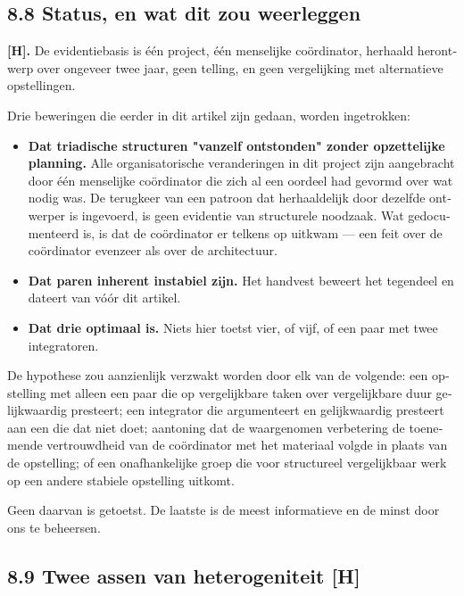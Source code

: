 \begin{dutch}
\subsection*{8.8 Status, en wat dit zou weerleggen}
\label{sec:nl:8.8}

\textbf{[H].} De evidentiebasis is één project, één menselijke coördinator, herhaald herontwerp over ongeveer twee jaar, geen telling, en geen vergelijking met alternatieve opstellingen.

Drie beweringen die eerder in dit artikel zijn gedaan, worden ingetrokken:

\begin{itemize}
  \item \textbf{Dat triadische structuren "vanzelf ontstonden" zonder opzettelijke planning.} Alle organisatorische veranderingen in dit project zijn aangebracht door één menselijke coördinator die zich al een oordeel had gevormd over wat nodig was. De terugkeer van een patroon dat herhaaldelijk door dezelfde ontwerper is ingevoerd, is geen evidentie van structurele noodzaak. Wat gedocumenteerd is, is dat de coördinator er telkens op uitkwam — een feit over de coördinator evenzeer als over de architectuur.
  \item \textbf{Dat paren inherent instabiel zijn.} Het handvest beweert het tegendeel en dateert van vóór dit artikel.
  \item \textbf{Dat drie optimaal is.} Niets hier toetst vier, of vijf, of een paar met twee integratoren.
\end{itemize}
De hypothese zou aanzienlijk verzwakt worden door elk van de volgende: een opstelling met alleen een paar die op vergelijkbare taken over vergelijkbare duur gelijkwaardig presteert; een integrator die argumenteert en gelijkwaardig presteert aan een die dat niet doet; aantoning dat de waargenomen verbetering de toenemende vertrouwdheid van de coördinator met het materiaal volgde in plaats van de opstelling; of een onafhankelijke groep die voor structureel vergelijkbaar werk op een andere stabiele opstelling uitkomt.

Geen daarvan is getoetst. De laatste is de meest informatieve en de minst door ons te beheersen.


\subsection*{8.9 Twee assen van heterogeniteit \textbf{[H]}}
\label{sec:nl:8.9}


\end{dutch}
